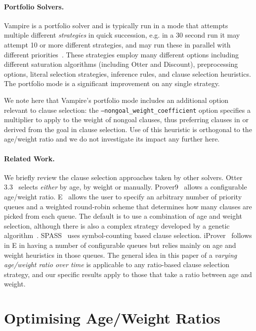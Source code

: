 \documentclass{llncs}
\begin{document}
\paragraph{Portfolio Solvers.}

Vampire is a portfolio solver and is typically run in a mode that attempts multiple different \emph{strategies} in quick succession, e.g. in a 30 second run it may attempt 10 or more different strategies, and may run these in parallel with different priorities~\cite{DBLP:conf/cade/RawsonR18}. These strategies employ many different options including different saturation algorithms (including Otter and Discount), preprocessing options, literal selection strategies, inference rules, and clause selection heuristics. The portfolio mode is a significant improvement on any single strategy. 

We note here that Vampire's portfolio mode includes an additional option relevant to clause selection: the \texttt{--nongoal\_weight\_coefficient} option specifies a multiplier to apply to the weight of nongoal clauses, thus preferring clauses in or derived from the goal in clause selection. Use of this heuristic is orthogonal to the age/weight ratio and we do not investigate its impact any further here.

\paragraph{Related Work.}
We briefly review the clause selection approaches taken by other solvers. 
Otter 3.3~\cite{otter3} selects \emph{either} by age, by weight or manually.
Prover9~\cite{prover9} allows a configurable age/weight ratio.
E~\cite{E} allows the user to specify an arbitrary number of priority queues and a weighted round-robin scheme that determines how many clauses are picked from each queue.
The default is to use a combination of age and weight selection, although there is also a complex strategy developed by a genetic algorithm~\cite{DBLP:conf/gcai/SchaferS15}. 
SPASS~\cite{Spass} uses symbol-counting based clause selection. 
iProver~\cite{Iprover} follows in E in having a number of configurable queues but relies mainly on age and weight heuristics in those queues. 
The general idea in this paper of a \emph{varying age/weight ratio over time} is applicable to any ratio-based clause selection strategy, and our specific results apply to those that take a ratio between age and weight.

\section{Optimising Age/Weight Ratios}
\label{sec:awr:study}
\end{document}
